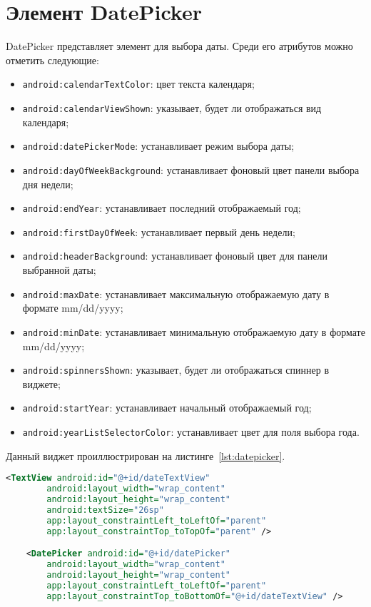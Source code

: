 \section{Элемент DatePicker}

DatePicker представляет элемент для выбора даты. Среди его атрибутов 
можно отметить следующие:
\begin{itemize}
	\item \texttt{android:calendarTextColor}: цвет текста календаря;
	\item \texttt{android:calendarViewShown}: указывает, будет ли
		отображаться вид календаря;
	\item \texttt{android:datePickerMode}: устанавливает режим выбора даты;
	\item \texttt{android:dayOfWeekBackground}: устанавливает фоновый цвет
		панели выбора дня недели;
	\item \texttt{android:endYear}: устанавливает последний отображаемый год;
	\item \texttt{android:firstDayOfWeek}: устанавливает первый день недели;
	\item \texttt{android:headerBackground}: устанавливает фоновый цвет
		для панели выбранной даты;
	\item \texttt{android:maxDate}: устанавливает максимальную отображаемую
		дату в формате mm/dd/yyyy;
	\item \texttt{android:minDate}: устанавливает минимальную отображаемую
		дату в формате mm/dd/yyyy;
	\item \texttt{android:spinnersShown}: указывает, будет ли отображаться
		спиннер в виджете;
	\item \texttt{android:startYear}: устанавливает начальный
		отображаемый год;
	\item \texttt{android:yearListSelectorColor}: устанавливает цвет для
		поля выбора года.
\end{itemize}

Данный виджет проиллюстрирован на листинге~\ref{lst:datepicker}.

\begin{lstlisting}[language=xml, caption=\leftline{datepicker XML}, label=lst:datepicker]
<TextView android:id="@+id/dateTextView"
        android:layout_width="wrap_content"
        android:layout_height="wrap_content"
        android:textSize="26sp"
        app:layout_constraintLeft_toLeftOf="parent"
        app:layout_constraintTop_toTopOf="parent" />

    <DatePicker android:id="@+id/datePicker"
        android:layout_width="wrap_content"
        android:layout_height="wrap_content"
        app:layout_constraintLeft_toLeftOf="parent"
        app:layout_constraintTop_toBottomOf="@+id/dateTextView" />
\end{lstlisting}

